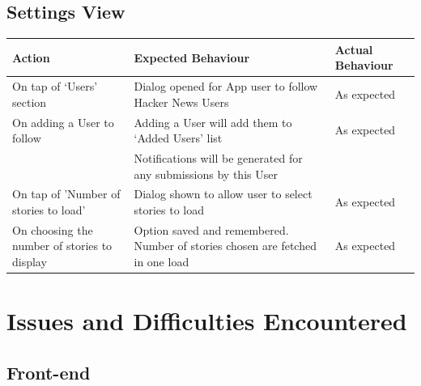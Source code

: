 \documentclass[11pt]{article}
\begin{document}
\subsection*{Settings View}
\begin{center}
\begin{tabular}{ | p{5cm} | p{5cm} | p{5cm} |}
	\hline
	\textbf{Action} & \textbf{Expected Behaviour} & \textbf{Actual Behaviour} \\
	\hline	
	On tap of ‘Users' section & Dialog opened for App user to follow Hacker News Users & As expected \\
	\hline
	On adding a User to follow & Adding a User will add them to ‘Added Users' list & As expected \\ & Notifications will be generated for any submissions by this User & \\
	\hline
	On tap of 'Number of stories to load' & Dialog shown to allow user to select stories to load & As expected \\
	\hline
	On choosing the number of stories to display & Option saved and remembered. Number of stories chosen are fetched in one load & As expected \\
	\hline
\end{tabular}
\end{center}

\section*{Issues and Difficulties Encountered}

\subsection*{Front-end}
\end{document}
